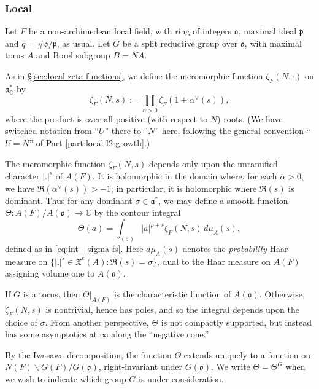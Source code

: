 \documentclass[reqno]{amsart}
\theoremstyle{plain} \newtheorem{theorem} {Theorem}
\theoremstyle{definition} \newtheorem{definition} [theorem] {Definition}
\theoremstyle{itplain} %
\numberwithin{equation}{section}
\numberwithin{theorem}{section}
\begin{document}
\subsubsection{Local}\label{sec:basic-vectors-local}
Let $F$ be a non-archimedean local field, with ring of integers $\mathfrak{o}$, maximal ideal $\mathfrak{p}$ and $q = \# \mathfrak{o} / \mathfrak{p}$, as usual.  Let $G$ be a split reductive group over $\mathfrak{o}$, with maximal torus $A$ and Borel subgroup $B = N A$.

As in \S\ref{sec:local-zeta-functions}, we define the meromorphic function $\zeta_F(N,\cdot)$ on $\mathfrak{a}_{\mathbb{C}}^*$ by
\begin{equation*}
\zeta_F(N,s) := \prod_{\alpha > 0} \zeta_F(1 + \alpha^\vee(s)),
\end{equation*}
where the product is over all positive (with respect to $N$) roots.  (We have switched notation from ``$U$'' there to ``$N$'' here, following the general convention ``$U = N$'' of Part \ref{part:local-l2-growth}.)

The meromorphic function $\zeta_F(N,s)$ depends only upon the unramified character $|.|^s$ of $A(F)$.  It is holomorphic in the domain where, for each $\alpha > 0$, we have $\Re(\alpha^\vee(s)) > -1$; in particular, it is holomorphic where $\Re(s)$ is dominant.  Thus for any dominant $\sigma \in \mathfrak{a}^*$, we may define a smooth function $\Theta : A(F) / A(\mathfrak{o}) \rightarrow \mathbb{C}$ by the contour integral 
\begin{equation*}
  \Theta(a) = \int _{(\sigma)} |a|^{\rho + s} \zeta_F(N,s) \, d \mu_{A}(s),
\end{equation*}
defined as in \eqref{eq:int-_sigma-fs}.  Here $d \mu_{A}(s)$ denotes the \emph{probability} Haar measure on $\{|.|^s \in \mathfrak{X}^e(A) : \Re(s)  = \sigma \}$, dual to the Haar measure on $A(F)$ assigning volume one to $A(\mathfrak{o})$.

If $G$ is a torus, then $\Theta|_{A(F)}$ is the characteristic function of $A(\mathfrak{o})$.  Otherwise, $\zeta_F(N,s)$ is nontrivial, hence has poles, and so the integral depends upon the choice of $\sigma$.  From another perspective, $\Theta$ is not compactly supported, but instead has some asymptotics at $\infty$ along the ``negative cone.''

By the Iwasawa decomposition, the function $\Theta$ extends uniquely to a function on $N(F) \backslash G(F) / G(\mathfrak{o})$, right-invariant under $G(\mathfrak{o})$.  We write $\Theta = \Theta^G$ when we wish to indicate which group $G$ is under consideration.
\end{document}

